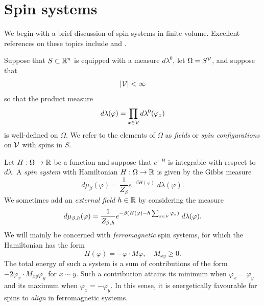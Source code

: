 
\section{Spin systems}
\label{sec:spins}

We begin with a brief discussion of spin systems in finite volume. Excellent
references on these topics include \cite{Georgii11} and \cite{FV17}.

Suppose that $S \subset {\mathbb R}^n$ is equipped with a measure $d\lambda^0$, let
$\Omega = S^{\mathcal{V}}$, and suppose that
\begin{equation}
|\mathcal{V}| < \infty
\end{equation}
so that the product measure
\begin{equation}
d\lambda(\varphi) = \prod_{x\in\mathcal{V}} d\lambda^0(\varphi_x)
\end{equation}
is well-defined on $\Omega$. We refer to the elements of $\Omega$ as \emph{fields}
or \emph{spin configurations} on $\mathcal{V}$ with spins in $S$.

Let $H : \Omega \rightarrow {\mathbb R}$ be a function and suppose
that $e^{-H}$ is integrable with respect to $d\lambda$.
A \emph{spin system} with Hamiltonian $H : \Omega \rightarrow {\mathbb R}$ is given
by the Gibbs measure
\begin{equation}
\label{e:gibbs-spin}
d\mu_\beta(\varphi)
	=
\frac{1}{Z_\beta} e^{-\beta H(\varphi)} \; d\lambda(\varphi).
\end{equation}
We sometimes add an \emph{external field} $h \in {\mathbb R}$ by considering the measure
\begin{equation}
\label{e:gibbs-spin-ext}
d\mu_{\beta,h}(\varphi)
	=
\frac{1}{Z_{\beta,h}}
e^{-\beta (H(\varphi) - h \sum_{x\in\mathcal{V}} \varphi_x)} \; d\lambda(\varphi).
\end{equation}
We will mainly be concerned with \emph{ferromagnetic} spin systems, for which the
Hamiltonian has the form
\begin{equation}
H(\varphi) = -\varphi \cdot M\varphi,
	\quad
M_{xy} \ge 0.
\end{equation}
The total energy of such a system is a sum of contributions
of the form $-2 \varphi_x \cdot M_{xy} \varphi_y$ for $x \sim y$. Such a
contribution
attains its minimum when $\varphi_x = \varphi_y$ and its maximum when
$\varphi_x = -\varphi_y$. In this sense, it is energetically favourable
for spins to \emph{align} in ferromagnetic systems.

